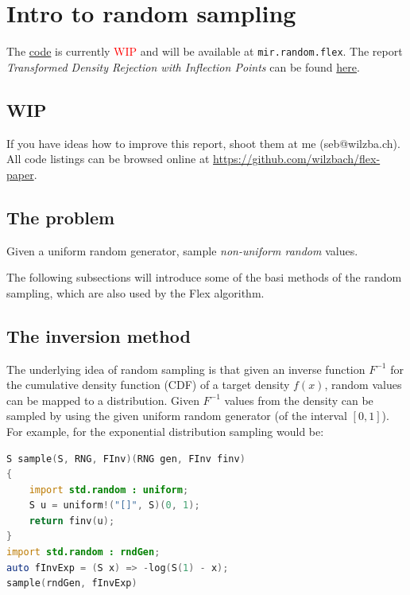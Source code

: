 \section{Intro to random sampling}

The \href{https://github.com/libmir/mir/pull/240}{code} is currently \textcolor{red}{WIP} and will be available at \texttt{mir.random.flex}. The report \textit{Transformed Density Rejection with Inflection Points} can be found  \href{http://epub.wu.ac.at/3158/1/techreport-110.pdf}{here}.

\subsection{WIP}

If you have ideas how to improve this report, shoot them at me (seb@wilzba.ch).
All code listings can be browsed online at \url{https://github.com/wilzbach/flex-paper}.

\subsection{The problem}

Given a uniform random generator, sample \textit{non-uniform random} values.

The following subsections will introduce some of the basi methods of the
random sampling, which are also used by the Flex algorithm.

\subsection{The inversion method}
\label{subsection:inversion}

The underlying idea of random sampling is that given an inverse function $F^{-1}$ for the cumulative density function (CDF) of a target density $f(x)$, random values can be mapped to a distribution. Given $F^{-1}$ values from the density can be sampled by using the given uniform random generator (of the interval $[0, 1]$).
For example, for the exponential distribution sampling would be:

\begin{lstlisting}[language=D]
S sample(S, RNG, FInv)(RNG gen, FInv finv)
{
    import std.random : uniform;
    S u = uniform!("[]", S)(0, 1);
    return finv(u);
}
import std.random : rndGen;
auto fInvExp = (S x) => -log(S(1) - x);
sample(rndGen, fInvExp)
\end{lstlisting}

